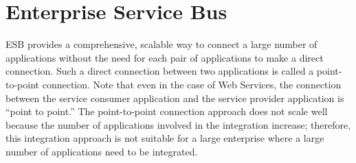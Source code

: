 \documentclass[12pt,a4paper,final,twoside,onecolumn,titlepage]{book}
\begin{document}
\section{Enterprise Service Bus}
\gls{ESB} provides a comprehensive, scalable way to connect a large number of applications without the need for each pair of applications to make a direct connection. Such a direct connection between two applications is called a point-to-point connection. Note that even in the case of Web Services, the connection between the service consumer application and the service provider application is “point to point.” The point-to-point connection approach does not scale well because the number of applications involved in the integration increase; therefore, this integration approach is not suitable for a large enterprise where a large number of applications need to be integrated.
\end{document}
